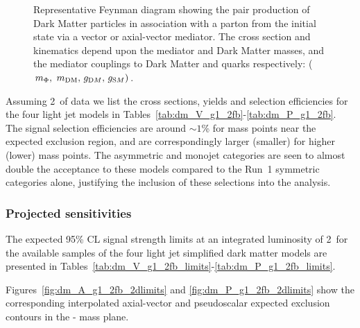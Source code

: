 \begin{figure}[h!] \centering
{}
\caption{Representative Feynman diagram showing the pair production of Dark
Matter particles in association with a parton from the initial state via a
vector or axial-vector mediator. The cross section and kinematics depend upon
the mediator and Dark Matter masses, and the mediator couplings to Dark Matter
and quarks respectively: ($m_{\Phi} ,\ m_\textrm{DM} ,\, g_{\textrm DM} ,\,
g_{\textrm SM})$. \cite{Abercrombie:2015wmb}} \label{fig:DMfeynman} \end{figure}



Assuming 2~\ifb of data we list the cross sections, yields and selection 
efficiencies for the four light jet models in
Tables~\ref{tab:dm_V_g1_2fb}-\ref{tab:dm_P_g1_2fb}. The signal selection
efficiencies are around $\sim 1$\% for mass points near the expected exclusion
region, and are correspondingly larger (smaller) for higher (lower) mass points.
The asymmetric and monojet categories are seen to almost double the acceptance
to these models compared to the Run~1 symmetric categories alone, justifying the
inclusion of these selections into the analysis.

\clearpage 
 \clearpage
 \clearpage
 \clearpage
 \clearpage


\subsubsection{Projected sensitivities}

The expected 95\% CL signal strength limits at an integrated luminosity of 2~\ifb for
the available samples of the four light jet simplified dark matter models are
presented in
Tables~\ref{tab:dm_V_g1_2fb_limits}-\ref{tab:dm_P_g1_2fb_limits}.

Figures~\ref{fig:dm_A_g1_2fb_2dlimits} and \ref{fig:dm_P_g1_2fb_2dlimits} show
the corresponding interpolated axial-vector and pseudoscalar expected exclusion 
contours in the {\mphi-\mchi} mass plane.

